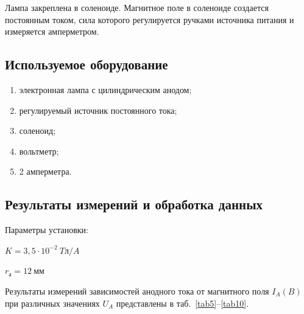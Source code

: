 \documentclass[a4paper, 12pt]{article}
\begin{document}
Лампа закреплена в соленоиде. Магнитное поле в соленоиде создается постоянным током, сила которого регулируется ручками источника питания и измеряется амперметром.

\subsection{Используемое оборудование}

\begin{enumerate}
    \item электронная лампа с цилиндрическим анодом;
    \item регулируемый источник постоянного тока;
    \item соленоид;
    \item вольтметр;
    \item 2 амперметра.
\end{enumerate}

\subsection{Результаты измерений и обработка данных}

Параметры установки:
\begin{description}
\item{} $K = 3,5 \cdot 10^{-2}~Tл/A$
\item{} $r_а = 12~мм$
\end{description}

Результаты измерений зависимостей анодного тока от магнитного поля $I_A(B)$ при различных значениях $U_A$ представлены в таб.~\ref{tab5}--\ref{tab10}.

\vspace{5cm}
\end{document}
